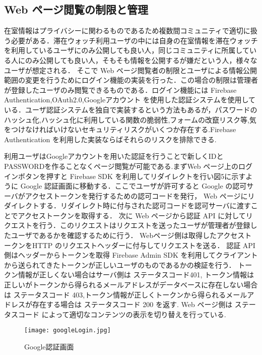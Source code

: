 \documentclass[a4j,8pt,twocolumn]{extarticle}
\begin{document}
\subsection{Web ページ閲覧の制限と管理}
 在室情報はプライバシーに関わるものであるため複数間コミュニティで適切に扱う必要がある．滞在ウォッチ利用ユーザの中には自身の在室情報を滞在ウォッチを利用しているユーザにのみ公開しても良い人，同じコミュニティに所属している人にのみ公開しても良い人，そもそも情報を公開するが嫌だという人，様々なユーザが想定される．
 そこで Web ページ閲覧者の制限とユーザによる情報公開範囲の変更を行うためにログイン機能の実装を行った．この場合の制限は管理者が登録したユーザのみ閲覧できるものである．ログイン機能には Firebase Authentication,OAuth2.0,Googleアカウント を使用した認証システムを使用している．ユーザ認証システムを独自で実装するという方法もあるが，パスワードのハッシュ化,ハッシュ化に利用している関数の脆弱性,フォームの改竄リスク等,気をつけなければいけないセキュリティリスクがいくつか存在する.Firebase Authentication を利用した実装ならばそれらのリスクを排除できる.

利用ユーザはGoogleアカウントを用いた認証を行うことで新しくIDとPASSWORDを作ることなくページ閲覧が可能である.まずWeb ページ上のログインボタンを押すと Firebase SDK を利用してリダイレクトを行い図5に示すように Google 認証画面に移動する．ここでユーザが許可すると Google の認可サーバがアクセストークンを発行するための認可コードを発行， Web ページにリダイレクトする．リダイレクト時に付与された認可コードを認可サーバに渡すことでアクセストークンを取得する．
次に Web ページから認証 API に対してリクエストを行う．このリクエストはリクエストを送ったユーザが管理者が登録したユーザであるかを確認するために行う．
Webページ側は取得したアクセストークンをHTTP のリクエストヘッダーに付与してリクエストを送る．
認証 API 側はヘッダーからトークンを取得 Firebase Admin SDK を利用してクライアントから送られてきたトークンが正しいユーザのものであるかの検証を行う．
トークン情報が正しくない場合はサーバ側は ステータスコード401,
トークン情報は正しいがトークンから得られるメールアドレスがデータベースに存在しない場合は ステータスコード 403,トークン情報が正しくトークンから得られるメールアドレスが存在する場合は ステータスコード 200 を返す.
Web ページ側は ステータスコード によって適切なコンテンツの表示を切り替えを行っている.

\begin{figure}[tbh]
    \centering
    \texttt{[image: googleLogin.jpg]}
    \caption{Google認証画面}
    \label{multipleBPM}
\end{figure}
\end{document}

